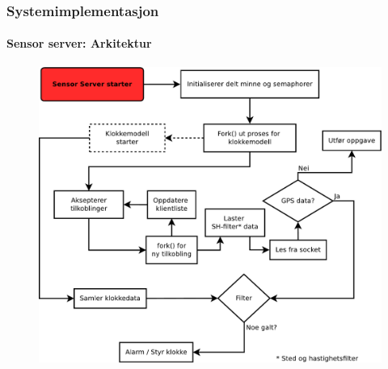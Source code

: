 \documentclass[xcolor=table]{beamer}
\begin{document}
\begin{frame}
\frametitle{Systemimplementasjon}
  \framesubtitle{Sensor server: Arkitektur}
    \begin{figure}
      \includegraphics[scale=0.25]{thesis/graphics/csac_core_simplified.pdf}
    \end{figure}
\end{frame}
\end{document}

